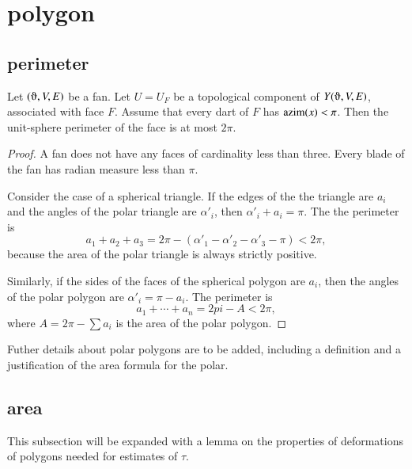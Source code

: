 \section{polygon}


\subsection{perimeter}


\begin{lemma}
Let $(\orgn,V,E)$ be a fan.  
Let $U=U_F$ be a topological component of $Y(\orgn,V,E)$, associated
with face $F$.
Assume
that every dart of $F$ has ${\operatorname{azim}}(x)<\pi$. 
Then the unit-sphere perimeter of the face is at most $2\pi$.
\end{lemma}

\begin{proof}  A fan does not have any faces of cardinality less than three.
Every blade of the fan has radian measure less than $\pi$.  

Consider the case of a spherical triangle.  If the edges of the
the triangle are $a_i$ and the angles of the polar
triangle are $\alpha'_i$, then $\alpha'_i+a_i=\pi$.
The the perimeter is 
$$a_1+a_2+a_3 = 2\pi - (\alpha'_1 -\alpha'_2 - \alpha'_3-\pi) < 2\pi,$$
because the area of the polar triangle is always strictly positive.

Similarly, if the sides of the faces of the spherical polygon are
$a_i$, then the angles of the polar polygon are $\alpha'_i = \pi-a_i$.
The perimeter is
$$
a_1+\cdots+a_n  = 2pi- A< 2\pi,
$$
where $A = 2\pi-\sum a_i$ is the area of the polar polygon.
\end{proof}

\begin{note}%
Futher details about polar polygons are to be added, including a definition and a justification of the area formula for the polar.
\end{note}


\subsection{area}

\begin{note}%
This subsection will be expanded with a lemma on the properties of  deformations of polygons needed for estimates of $\tau$.
\end{note}


